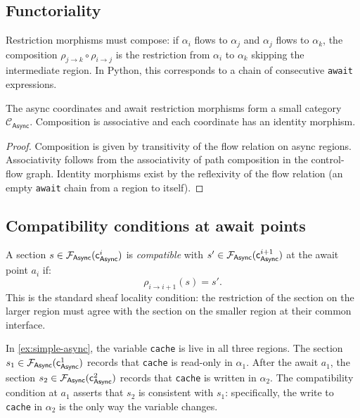 \documentclass[11pt]{article}
\newcommand{\Async}{\mathsf{Async}}          %
\newcommand{\AwaitMor}[2]{\rho_{#1 \to #2}} %
\newcommand{\asyncCoord}[1]{\coord_{\Async}^{#1}} %
\newcommand{\asyncSheaf}{\mathcal{F}_{\Async}} %
\newcommand{\asyncRegion}[1]{\alpha_{#1}}    %
\begin{document}
\subsection{Functoriality}

Restriction morphisms must compose: if $\asyncRegion{i}$ flows to
$\asyncRegion{j}$ and $\asyncRegion{j}$ flows to $\asyncRegion{k}$, the
composition $\AwaitMor{j}{k} \circ \AwaitMor{i}{j}$ is the restriction
from $\asyncRegion{i}$ to $\asyncRegion{k}$ skipping the intermediate region.
In Python, this corresponds to a chain of consecutive \texttt{await}
expressions.

\begin{proposition}\label{prop:await-cat}
The async coordinates and await restriction morphisms form a small category
$\mathcal{C}_{\Async}$.  Composition is associative and each coordinate
has an identity morphism.
\end{proposition}
\begin{proof}
Composition is given by transitivity of the flow relation on async regions.
Associativity follows from the associativity of path composition in the
control-flow graph.  Identity morphisms exist by the reflexivity of the
flow relation (an empty \texttt{await} chain from a region to itself).
\end{proof}

\subsection{Compatibility conditions at await points}

A section $s \in \asyncSheaf(\asyncCoord{i})$ is \emph{compatible} with
$s' \in \asyncSheaf(\asyncCoord{i+1})$ at the await point $a_i$ if:
\[
  \AwaitMor{i}{i+1}(s) = s'.
\]
This is the standard sheaf locality condition: the restriction of the
section on the larger region must agree with the section on the smaller
region at their common interface.

\begin{example}
In \cref{ex:simple-async}, the variable \texttt{cache} is live in all three
regions.  The section $s_1 \in \asyncSheaf(\asyncCoord{1})$ records that
\texttt{cache} is read-only in $\asyncRegion{1}$.  After the await $a_1$,
the section $s_2 \in \asyncSheaf(\asyncCoord{2})$ records that \texttt{cache}
is written in $\asyncRegion{2}$.  The compatibility condition at $a_1$
asserts that $s_2$ is consistent with $s_1$: specifically, the write to
\texttt{cache} in $\asyncRegion{2}$ is the only way the variable changes.
\end{example}
\end{document}
